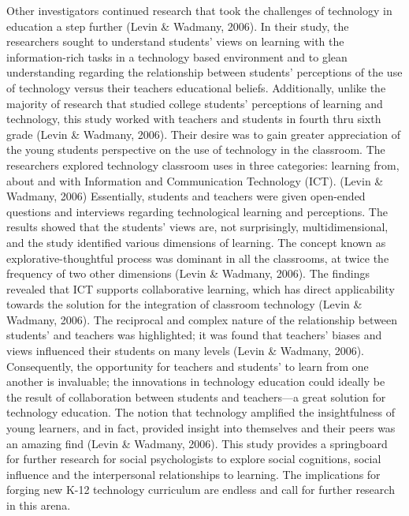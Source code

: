 Other investigators continued research that took the challenges of technology in education a step further (Levin \& Wadmany, 2006). In their study, the researchers sought to understand students’ views on learning with the information-rich tasks in a technology based environment and to glean understanding regarding the relationship between students’ perceptions of the use of technology versus their teachers educational beliefs. Additionally, unlike the majority of research that studied college students’ perceptions of learning and technology, this study worked with teachers and students in fourth thru sixth grade (Levin \& Wadmany, 2006). Their desire was to gain greater appreciation of the young students perspective on the use of technology in the classroom.  The researchers explored technology classroom uses in three categories: learning from, about and with Information and Communication Technology (ICT). (Levin \& Wadmany, 2006) Essentially, students and teachers were given open-ended questions and interviews regarding technological learning and perceptions.  The results showed that the students’ views are, not surprisingly, multidimensional, and the study identified various dimensions of learning. The concept known as explorative-thoughtful process was dominant in all the classrooms, at twice the frequency of two other dimensions (Levin \& Wadmany, 2006).  The findings revealed that ICT supports collaborative learning, which has direct applicability towards the solution for the integration of classroom technology (Levin \& Wadmany, 2006). The reciprocal and complex nature of the relationship between students’ and teachers was highlighted; it was found that teachers’ biases and views influenced their students on many levels (Levin \& Wadmany, 2006).  Consequently, the opportunity for teachers and students’ to learn from one another is invaluable; the innovations in technology education could ideally be the result of collaboration between students and teachers—a great solution for technology education.  The notion that technology amplified the insightfulness of young learners, and in fact, provided insight into themselves and their peers was an amazing find (Levin \& Wadmany, 2006). This study provides a springboard for further research for social psychologists to explore social cognitions, social influence and the interpersonal relationships to learning. The implications for forging new K-12 technology curriculum are endless and call for further research in this arena.

